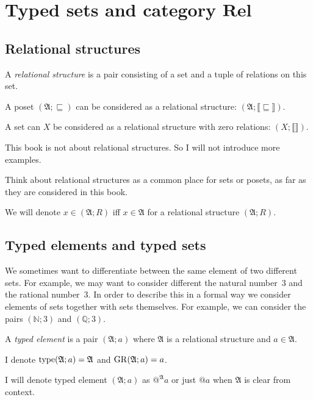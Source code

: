 
\chapter{\texorpdfstring{Typed sets and category $\mathbf{Rel}$}%
{Typed sets and category Rel}}


\section{Relational structures}
\begin{defn}
A \emph{relational structure} is a pair
consisting of a set and a tuple of relations on this set.
\end{defn}
A poset $(\mathfrak{A};\sqsubseteq)$ can be considered as a relational
structure: $(\mathfrak{A};\llbracket\sqsubseteq\rrbracket).$

A set can $X$ be considered as a relational structure with zero relations:
$(X;\llbracket\rrbracket).$

This book is not about relational structures. So I will not introduce
more examples.

Think about relational structures as a common place for sets or posets,
as far as they are considered in this book.

We will denote $x\in(\mathfrak{A};R)$ iff $x\in\mathfrak{A}$ for
a relational structure $(\mathfrak{A};R)$.


\section{Typed elements and typed sets}

We sometimes want to differentiate between the same element of two
different sets. For example, we may want to consider different the
natural number~$3$ and the rational number~$3$. In order to describe
this in a formal way we consider elements of sets together with sets
themselves. For example, we can consider the pairs $(\mathbb{N};3)$
and $(\mathbb{Q};3)$.
\begin{defn}
A \emph{typed element}
is a pair $(\mathfrak{A};a)$ where $\mathfrak{A}$ is a relational
structure and $a\in\mathfrak{A}$.

I denote $\operatorname{type}(\mathfrak{A};a)=\mathfrak{A}$ and $\operatorname{GR}(\mathfrak{A};a)=a$.
\end{defn}

\begin{defn}
I will denote typed element $(\mathfrak{A};a)$ as $@^{\mathfrak{A}} a$ or just
$@a$ when $\mathfrak{A}$ is clear from context.
\end{defn}

